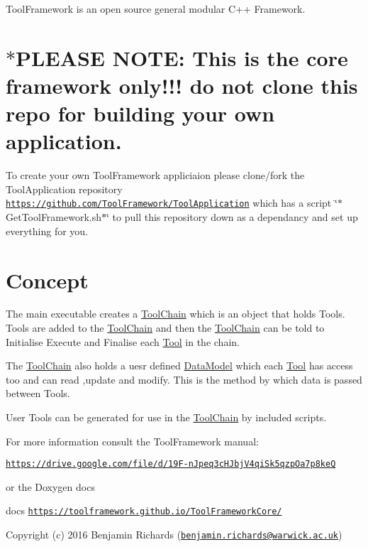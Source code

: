 

Tool\-Framework is an open source general modular C++ Framework.

\section*{$\ast$\-P\-L\-E\-A\-S\-E N\-O\-T\-E\-: This is the core framework only!!! do not clone this repo for building your own application.}

To create your own Tool\-Framework appliciaion please clone/fork the Tool\-Application repository \href{https://github.com/ToolFramework/ToolApplication}{\tt https\-://github.\-com/\-Tool\-Framework/\-Tool\-Application} which has a script \char`\"{}$\ast$\-Get\-Tool\-Framework.\-sh$\ast$\char`\"{} to pull this repository down as a dependancy and set up everything for you.



 \section*{Concept}





The main executable creates a \hyperlink{classToolChain}{Tool\-Chain} which is an object that holds Tools. Tools are added to the \hyperlink{classToolChain}{Tool\-Chain} and then the \hyperlink{classToolChain}{Tool\-Chain} can be told to Initialise Execute and Finalise each \hyperlink{classTool}{Tool} in the chain.

The \hyperlink{classToolChain}{Tool\-Chain} also holds a uesr defined \hyperlink{classDataModel}{Data\-Model} which each \hyperlink{classTool}{Tool} has access too and can read ,update and modify. This is the method by which data is passed between Tools.

User Tools can be generated for use in the \hyperlink{classToolChain}{Tool\-Chain} by included scripts.

For more information consult the Tool\-Framework manual\-:

\href{https://drive.google.com/file/d/19F-nJpeq3cHJbjV4qiSk5qzpOa7p8keQ}{\tt https\-://drive.\-google.\-com/file/d/19\-F-\/n\-Jpeq3c\-H\-Jbj\-V4qi\-Sk5qzp\-Oa7p8ke\-Q}

or the Doxygen docs

docs \href{https://toolframework.github.io/ToolFrameworkCore/}{\tt https\-://toolframework.\-github.\-io/\-Tool\-Framework\-Core/}

Copyright (c) 2016 Benjamin Richards (\href{mailto:benjamin.richards@warwick.ac.uk}{\tt benjamin.\-richards@warwick.\-ac.\-uk}) 
